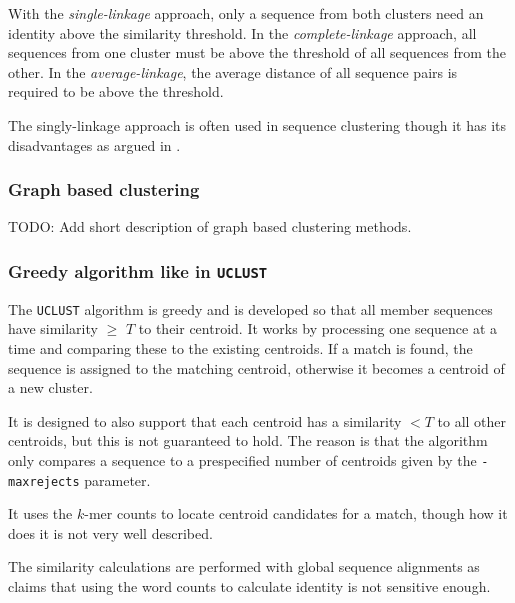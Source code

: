 With the \textit{single-linkage} approach, only a sequence from both clusters
need an identity above the similarity threshold.  In the
\textit{complete-linkage} approach, all sequences from one cluster must be
above the threshold of all sequences from the other.  In the
\textit{average-linkage}, the average distance of all sequence pairs is
required to be above the threshold.

The singly-linkage approach is often used in sequence clustering though it has
its disadvantages as argued in \cite[pp. 62-63]{dong}.

\subsubsection{Graph based clustering}

TODO: Add short description of graph based clustering methods. %


\subsubsection{Greedy algorithm like in \texttt{UCLUST}}
The \texttt{UCLUST} algorithm is greedy and is developed so that all member
sequences have similarity $\geq$ $T$ to their centroid.  It works by processing
one sequence at a time and comparing these to the existing centroids. If a
match is found, the sequence is assigned to the matching centroid, otherwise it
becomes a centroid of a new cluster.

It is designed to also support that each centroid has a similarity $<T$ to all
other centroids, but this is not guaranteed to hold. The reason is that the
algorithm only compares a sequence to a prespecified number of centroids given
by the \texttt{-maxrejects} parameter.

It uses the $k$-mer counts to locate centroid candidates for a match, though
how it does it is not very well described.

The similarity calculations are performed with global sequence alignments as
\cite{usearch} claims that using the word counts to calculate identity is not
sensitive enough.







